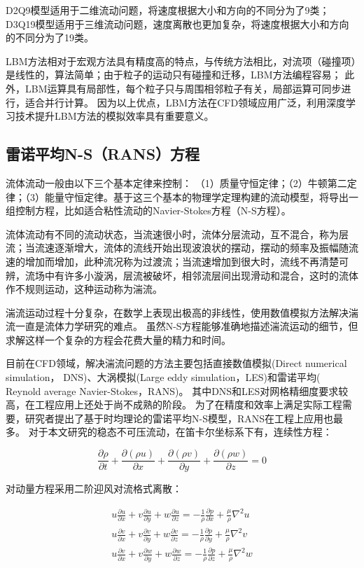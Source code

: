 \noindent D2Q9模型适用于二维流动问题，将速度根据大小和方向的不同分为了9类；
D3Q19模型适用于三维流动问题，速度离散也更加复杂，将速度根据大小和方向的不同分为了19类。

LBM方法相对于宏观方法具有精度高的特点，与传统方法相比，对流项（碰撞项）是线性的，算法简单；由于粒子的运动只有碰撞和迁移，LBM方法编程容易；
此外，LBM运算具有局部性，每个粒子只与周围相邻粒子有关，局部运算可同步进行，适合并行计算。
因为以上优点，LBM方法在CFD领域应用广泛，利用深度学习技术提升LBM方法的模拟效率具有重要意义。


\subsection{雷诺平均N-S（RANS）方程}
流体流动一般由以下三个基本定律来控制：
（1）质量守恒定律；（2）牛顿第二定律；（3）能量守恒定律。基于这三个基本的物理学定理构建的流动模型，将导出一组控制方程，比如适合粘性流动的Navier-Stokes方程（N-S方程）。

流体流动有不同的流动状态，当流速很小时，流体分层流动，互不混合，称为层流；当流速逐渐增大，流体的流线开始出现波浪状的摆动，摆动的频率及振幅随流速的增加而增加，此种流况称为过渡流；当流速增加到很大时，流线不再清楚可辨，流场中有许多小漩涡，层流被破坏，相邻流层间出现滑动和混合，这时的流体作不规则运动，这种运动称为湍流。

湍流运动过程十分复杂，在数学上表现出极高的非线性，使用数值模拟方法解决湍流一直是流体力学研究的难点。
虽然N-S方程能够准确地描述湍流运动的细节，但求解这样一个复杂的方程会花费大量的精力和时间。

目前在CFD领域，解决湍流问题的方法主要包括直接数值模拟(Direct numerical simulation，
DNS)、大涡模拟(Large eddy simulation，LES)和雷诺平均( Reynold average Navier-Stokes，RANS)。
其中DNS和LES对网格精细度要求较高，在工程应用上还处于尚不成熟的阶段。
为了在精度和效率上满足实际工程需要，研究者提出了基于时均理论的雷诺平均N-S模型，RANS在工程上应用也最多。
对于本文研究的稳态不可压流动，在笛卡尔坐标系下有，连续性方程：

\begin{equation}
\label{连续性方程}
\frac{\partial \rho}{\partial t}+\frac{\partial(\rho u)}{\partial x}+\frac{\partial(\rho v)}{\partial y}+\frac{\partial(\rho w)}{\partial z}=0\end{equation}

\noindent 对动量方程采用二阶迎风对流格式离散：


\begin{equation}\begin{array}{c}
\label{动量方程}
u \frac{\partial u}{\partial x}+v \frac{\partial u}{\partial y}+w \frac{\partial u}{\partial z}=-\frac{1}{\rho} \frac{\partial p}{\partial x}+\frac{\mu}{\rho} \nabla^{2} u \\
u \frac{\partial v}{\partial x}+v \frac{\partial v}{\partial y}+w \frac{\partial v}{\partial z}=-\frac{1}{\rho} \frac{\partial p}{\partial y}+\frac{\mu}{\rho} \nabla^{2} v \\
u \frac{\partial v}{\partial x}+v \frac{\partial w}{\partial y}+w \frac{\partial w}{\partial z}=-\frac{1}{\rho} \frac{\partial p}{\partial z}+\frac{\mu}{\rho} \nabla^{2} w
\end{array}
\end{equation}


